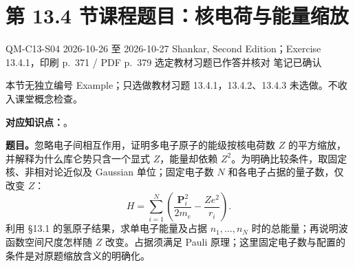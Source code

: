 \section{第 13.4 节课程题目：核电荷与能量缩放}
\label{exercises:QM-C13-S04}
\exercisemeta
  {QM-C13-S04}
  {2026-10-26 至 2026-10-27}
  {Shankar, Second Edition；Exercise 13.4.1，印刷 p.~371 / PDF p.~379}
  {选定教材习题已作答并核对}
  {笔记已确认}

本节无独立编号 Example；只选做教材习题 13.4.1，13.4.2、13.4.3 未选做。不收入课堂概念检查。

\textbf{对应知识点：}。

\textbf{题目。}忽略电子间相互作用，证明多电子原子的能级按核电荷数 $Z$ 的平方缩放，并解释为什么库仑势只含一个显式 $Z$，能量却依赖 $Z^2$。为明确比较条件，取固定核、非相对论近似及 Gaussian 单位；固定电子数 $N$ 和各电子占据的量子数，仅改变 $Z$：
\begin{equation}
  H=\sum_{i=1}^N\left(\frac{\mathbf P_i^2}{2m_e}-\frac{Ze^2}{r_i}\right).
\end{equation}
利用 \S 13.1 的氢原子结果，求单电子能量及占据 $n_1,\ldots,n_N$ 时的总能量；再说明波函数空间尺度怎样随 $Z$ 改变。占据须满足 Pauli 原理；这里固定电子数与配置的条件是对原题缩放含义的明确化。

